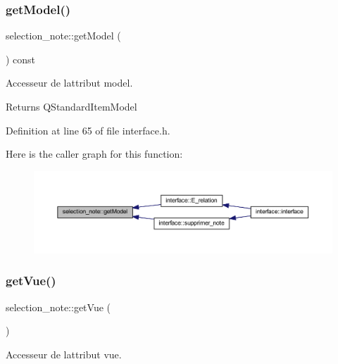 \subsubsection{\texorpdfstring{get\+Model()}{getModel()}}
{\footnotesize\ttfamily selection\+\_\+note\+::get\+Model (\begin{DoxyParamCaption}{ }\end{DoxyParamCaption}) const\hspace{0.3cm}{\ttfamily [inline]}}



Accesseur de l\textquotesingle{}attribut model. 

\begin{DoxyReturn}{Returns}
Q\+Standard\+Item\+Model 
\end{DoxyReturn}


Definition at line 65 of file interface.\+h.

Here is the caller graph for this function\+:\nopagebreak
\begin{figure}[H]
\begin{center}
\leavevmode
\includegraphics[width=350pt]{classselection__note_a1fce8a25d0a91689b417fcd88fb982ca_icgraph}
\end{center}
\end{figure}
\mbox{\label{classselection__note_a8ebca9b8b266b7891b807a5f1af3cf2b}} 
\subsubsection{\texorpdfstring{get\+Vue()}{getVue()}}
{\footnotesize\ttfamily selection\+\_\+note\+::get\+Vue (\begin{DoxyParamCaption}{ }\end{DoxyParamCaption})\hspace{0.3cm}{\ttfamily [inline]}}



Accesseur de l\textquotesingle{}attribut vue. 


